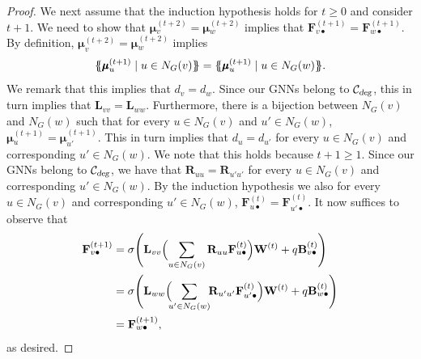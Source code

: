 \begin{proof}
We next assume that the induction hypothesis holds for $t\geq 0$ and consider $t+1$. We need to show that 
$\pmb{\mu}{}^{(t+2)}_v=\pmb{\mu}{}^{(t+2)}_w$ implies that $\mathbf{F}^{(t+1)}_{v\bullet}=\mathbf{F}^{(t+1)}_{w\bullet}$. By definition,
$\pmb{\mu}^{(t+2)}_v=\pmb{\mu}{}^{(t+2)}_w$ implies
$$
\ldbl \pmb{\mu}{}^{(t+1)}_u \st u \in N_G(v) \rdbl=
 \ldbl \pmb{\mu}{}^{(t+1)}_u \st u \in N_G(w) \rdbl.$$
We remark that this implies that $d_v=d_w$. Since our GNNs belong to ${\cal C}_{\textsl{deg}}$, this in turn implies that $\mathbf{L}_{vv}=\mathbf{L}_{ww}$.
%
Furthermore, there is a bijection between $N_G(v)$ and $N_G(w)$ such that
for every $u\in N_G(v)$ and $u'\in N_G(w)$, $\pmb{\mu}{}^{(t+1)}_u=\pmb{\mu}{}^{(t+1)}_{u'}$. This in turn implies that
$d_u=d_{u'}$ for every $u\in N_G(v)$ and corresponding $u'\in N_G(w)$. We note that this holds because $t+1\geq 1$. Since our GNNs belong to ${\cal C}_{\textsl{deg}}$, we have that $\mathbf{R}_{uu}=\mathbf{R}_{u'u'}$ for every
$u\in N_G(v)$ and corresponding $u'\in N_G(w)$. 
By the induction hypothesis we also for every $u\in N_G(v)$
   and corresponding $u'\in N_G(w)$, $\mathbf{F}^{(t)}_{u\bullet}=\mathbf{F}^{(t)}_{u'\bullet}$. It now suffices to observe that
  \begin{align*}
  \mathbf{F}^{(t+1)}_{v\bullet}&=\sigma\Biggl(\mathbf{L}_{vv}\Bigl(\sum_{u\in N_G(v)} \mathbf{R}_{uu}\mathbf{F}^{(t)}_{u\bullet}\Bigr)\mathbf{W}^{(t)}+ q\mathbf{B}^{(t)}_{v\bullet}\Biggr)\\
	 & =\sigma\Biggl(\mathbf{L}_{ww}\Bigl(\!\!\sum_{u'\in N_G(w)}\!\! \mathbf{R}_{u'u'}\mathbf{F}^{(t)}_{u'\bullet}\Bigr)\mathbf{W}^{(t)}+ q\mathbf{B}^{(t)}_{w\bullet}\Biggr)\\
	  &=\mathbf{F}^{(t+1)}_{w\bullet},
\end{align*}
as desired.
\end{proof}

